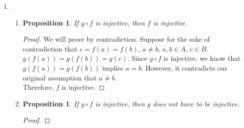 \documentclass{article}
\newtheorem{prop}[thm]{Proposition}
\begin{document}
\begin{enumerate}
\begin{enumerate}
    \item \begin{prop}
    $\gamma$ is a not well defined function.
    \end{prop}
    \begin{proof}
    Let $x \in \mathbb{R}$. Consider the case $x = 0$. We will show that $\gamma(x) \notin \mathbb{R}$. $\gamma(x) = \frac{0}{|0|} = \frac{0}{0}$, which is undefined. Therfore, $\gamma$ is not a well defined function.
    \end{proof}
\end{enumerate}


\item \begin{enumerate}
    \item \begin{prop}
        If $g \circ f$ is injective, then $f$ is injective.
    \end{prop}
    \begin{proof}
        We will prove by contradiction. Suppose for the sake of contradiction that $c = f(a) = f(b)$, $a \neq b$, $a, b \in A$, $c \in B$. \\ 
        
        $g(f(a)) = g(f(b)) = g(c)$. Since $g \circ f$ is injective, we know that $g(f(a)) = g(f(b))$ implies $a = b$. However, it contradicts our original assumption that $a \neq b$. \\ 
        
        Therefore, $f$ is injective.
    \end{proof}
    
    \item \begin{prop}
        If $g \circ f$ is injective, then $g$ does not have to be injective.
    \end{prop}
    \begin{proof}
        
        
        

\end{proof}
\end{enumerate}
\end{enumerate}
\end{document}
